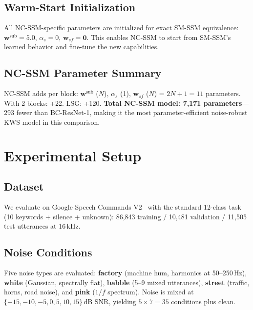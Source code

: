 \documentclass[journal]{IEEEtran}
\begin{document}
\subsection{Warm-Start Initialization}

All NC-SSM-specific parameters are initialized for exact SM-SSM equivalence:
$\mathbf{w}^{\text{sub}} = 5.0$, $\alpha_s = 0$, $\mathbf{w}_{sf} = \mathbf{0}$.
This enables NC-SSM to start from SM-SSM's learned behavior and fine-tune the new capabilities.

\subsection{NC-SSM Parameter Summary}

NC-SSM adds per block: $\mathbf{w}^{\text{sub}}$ ($N$), $\alpha_s$ (1), $\mathbf{w}_{sf}$ ($N$) = $2N{+}1 = 11$ parameters.
With 2 blocks: +22. LSG: +120.
\textbf{Total NC-SSM model: 7{,}171 parameters}---293 fewer than BC-ResNet-1, making it the most parameter-efficient noise-robust KWS model in this comparison.


\section{Experimental Setup}
\label{sec:setup}

\subsection{Dataset}

We evaluate on Google Speech Commands V2~\cite{warden2018speech} with the standard 12-class task (10 keywords + silence + unknown): 86{,}843 training / 10{,}481 validation / 11{,}505 test utterances at 16\,kHz.

\subsection{Noise Conditions}

Five noise types are evaluated:
\textbf{factory} (machine hum, harmonics at 50--250\,Hz),
\textbf{white} (Gaussian, spectrally flat),
\textbf{babble} (5--9 mixed utterances),
\textbf{street} (traffic, horns, road noise), and
\textbf{pink} ($1/f$ spectrum).
Noise is mixed at $\{-15, -10, -5, 0, 5, 10, 15\}$\,dB SNR, yielding $5 \times 7 = 35$ conditions plus clean.
\end{document}

